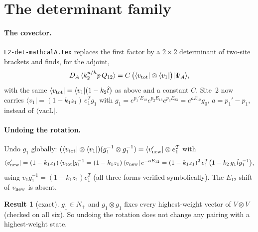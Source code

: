 \documentclass[11pt]{article}
\newcommand{\vacL}{\langle\mathrm{vacL}|}
\newcommand{\nb}[1]{\texttt{#1}}
\theoremstyle{definition}
\newtheorem{result}{Result}
\theoremstyle{remark}
\begin{document}
\section{The determinant family}\label{sec:det}

\paragraph{The covector.}
\nb{L2-det-mathcalA.tex} replaces the first factor by a $2\times2$ determinant of two-site brackets and finds, for the adjoint,
\begin{equation}
D_A\,\langle k_2^{u/h}p\,Q_{12}\rangle=C\,\big(\langle v_{\rm tot}|\otimes\langle v_1|\big)|\Psi_A\rangle,
\end{equation}
with the same $\langle v_{\rm tot}|=\langle v_1|(1-k_2\hat t)$ as above and a constant $C$. Site~2 now carries $\langle v_1|=(1-k_1z_1)\,e_1^Tg_1$ with $g_1=e^{p_1'E_{12}}e^{p_2E_{13}}e^{p_3E_{23}}=e^{aE_{12}}g_0$, $a=p_1'-p_1$, instead of $\vacL$.

\paragraph{Undoing the rotation.}
Undo $g_1$ globally: $(\langle v_{\rm tot}|\otimes\langle v_1|)(g_1^{-1}\otimes g_1^{-1})=\langle v'_{\rm new}|\otimes e_1^T$ with
\begin{equation}
\langle v'_{\rm new}|=(1-k_1z_1)\,\langle v_{\rm tot}|g_1^{-1}=(1-k_1z_1)\,\langle v_{\rm new}|\,e^{-aE_{12}}=(1-k_1z_1)^2\,e_1^T\big(1-k_2\,g_1\hat tg_1^{-1}\big),
\end{equation}
using $v_1g_1^{-1}=(1-k_1z_1)e_1^T$ (all three forms verified symbolically). The $E_{12}$ shift of $v_{\rm new}$ is absent.

\begin{result}[exact]\label{res:nplus}
$g_1\in N_+$ and $g_1\otimes g_1$ fixes every highest-weight vector of $V\otimes V$ (checked on all six). So undoing the rotation does not change any pairing with a highest-weight state.
\end{result}
\end{document}
